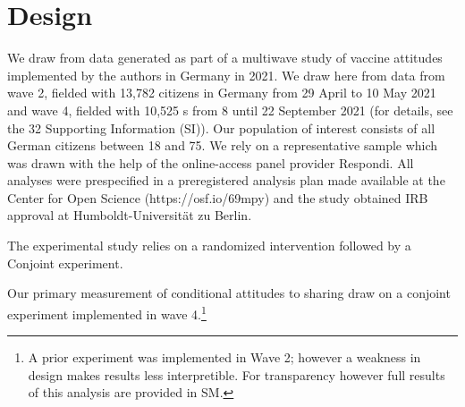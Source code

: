 \documentclass[12pt,oneside,smallheadings,chapterprefix=true]{article}
\begin{document}
\section*{Design}
\label{sec:design}

We draw from data generated as part of a multiwave study of vaccine attitudes implemented by the authors in Germany in 2021. We draw here from data from wave 2, fielded with 13,782 citizens in Germany from 29 April to 10 May 2021 and wave 4, fielded with 10,525 s from 8 until 22 September 2021 (for details, see the 32 Supporting Information (SI)). Our population of interest consists of all German citizens between 18 and 75. We rely on a representative sample which was drawn with the help of the online-access panel provider \hspace{0pt}Respondi\hspace{0pt}\hspace{0pt}. All analyses were prespecified in a preregistered analysis plan made available at the Center for Open Science (https://osf.io/69mpy) and the study obtained IRB approval at Humboldt-Universität zu Berlin.
  

The experimental study relies on a randomized intervention followed by a Conjoint experiment. 


Our primary measurement of conditional attitudes to sharing draw on a conjoint experiment implemented in wave 4.\footnote{A prior experiment was implemented in Wave 2; however a weakness in design makes results less interpretible. For transparency however full results of this analysis are provided in SM. } 
\end{document}
